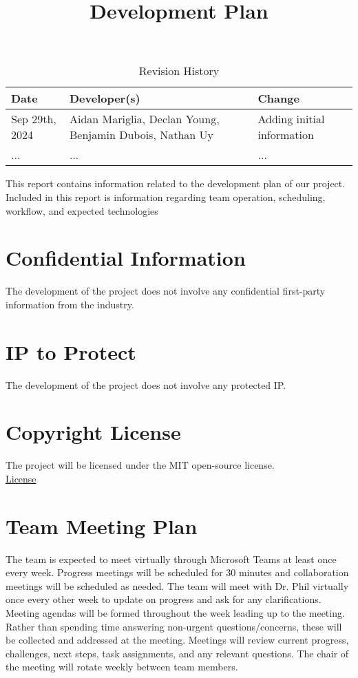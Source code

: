 \documentclass{article}
\title{Development Plan\\\progname}
\author{\authname}
\date{}
\begin{document}
\maketitle

\begin{table}[hp]
\caption{Revision History} \label{TblRevisionHistory}
\begin{tabularx}{\textwidth}{lp{5cm}X}
\toprule
\textbf{Date} & \textbf{Developer(s)} & \textbf{Change}\\
\midrule
Sep 29th, 2024 & Aidan Mariglia, Declan Young, Benjamin Dubois, Nathan Uy & Adding initial information\\ 
... & ... & ...\\
\bottomrule
\end{tabularx}
\end{table}

\newpage{}

This report contains information related to the development plan of our project. Included in this report is information regarding team operation, scheduling, workflow, and expected technologies

\section{Confidential Information}

The development of the project does not involve any confidential first-party information from the industry.

\section{IP to Protect}

The development of the project does not involve any protected IP.

\section{Copyright License}

The project will be licensed under the MIT open-source license. \\
\href{https://github.com/AidanMariglia/SOCAlgoTestPlatform/blob/main/LICENSE}{License}

\section{Team Meeting Plan}

The team is expected to meet virtually through Microsoft Teams at least once every week. Progress meetings will be scheduled for 30 minutes and collaboration meetings will be scheduled as needed. The team will meet with Dr. Phil virtually once every other week to update on progress and ask for any clarifications. Meeting agendas will be formed throughout the week leading up to the meeting. Rather than spending time answering non-urgent questions/concerns, these will be collected and addressed at the meeting. Meetings will review current progress, challenges, next steps, task assignments, and any relevant questions. The chair of the meeting will rotate weekly between team members.
\end{document}
